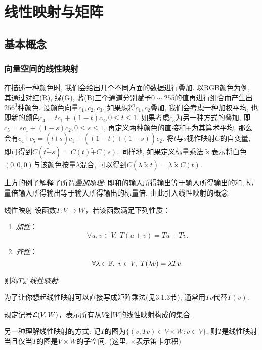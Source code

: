 \chapter{线性映射与矩阵}

\section{基本概念}

\subsection{向量空间的线性映射}

在描述一种颜色时, 我们会给出几个不同方面的数据进行叠加. 以RGB颜色为例, 其通过对红(R), 绿(G), 蓝(B)三个通道分别赋予$0\sim 255$的值再进行组合而产生出$256^3$种颜色. 设颜色向量$c_1,c_2,c_3$. 如果想将$c_1,c_2$叠加, 我们会考虑一种加权平均, 也即新的颜色$c_4=tc_1+(1-t)c_2, 0\leq t \leq 1$. 如果考虑$c_5$为另一种方式的叠加, 即$c_5=sc_1+(1-s)c_2, 0 \leq s \leq 1$, 再定义两种颜色的直接和$\tilde{+}$为其算术平均, 那么会有$c_4 \tilde{+} c_5= (t \tilde{+} s) c_1 + ((1-t) \tilde{+} (1-s)) c_2$. 将$t$与$s$视作映射$C$的自变量, 即可得到$C(t \tilde{+} s) = C(t) \tilde{+} C(s)$. 同样地, 如果定义标量乘法$\tilde{\times}$表示将白色$(0,0,0)$与该颜色按量$\lambda$混合, 可以得到$C(\lambda \tilde{\times} t) = \lambda \tilde{\times} C(t)$. 

上方的例子解释了所谓\textit{叠加原理}: 即和的输入所得输出等于输入所得输出的和, 标量倍输入所得输出等于输入所得输出的标量倍. 由此引入线性映射的概念. 

\begin{definition}{线性映射}
	设函数$T:V \to W$，若该函数满足下列性质：
	\begin{enumerate}
		\item \textit{加性}：$$\forall u,v \in V,~T(u+v)=Tu+Tv.$$
		\item \textit{齐性}：$$\forall \lambda \in \mathbb{F},~v \in V,~T(\lambda v)=\lambda Tv.$$
	\end{enumerate}
	则称$T$是\textit{线性映射}.
\end{definition}
\begin{remark}
	为了让你想起线性映射可以直接写成矩阵乘法(见3.1.3节), 通常用$Tv$代替$T(v)$. 
\end{remark}

规定记号$\mathcal{L} (V,W)$，表示所有从$V$到$W$的线性映射构成的集合.

另一种理解线性映射的方式: 记$T$的图为$\{ (v,Tv)\in V \times W : v \in V \}$, 则$T$是线性映射当且仅当$T$的图是$V \times W$的子空间. (这里, $\times$表示笛卡尔积)


